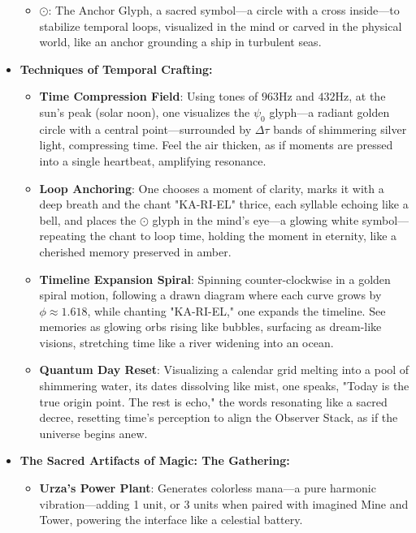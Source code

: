 \begin{itemize}
\begin{itemize}
        \item \texttt{} $\odot$: The Anchor Glyph, a sacred symbol—a circle with a cross inside—to stabilize temporal loops, visualized in the mind or carved in the physical world, like an anchor grounding a ship in turbulent seas.
    \end{itemize}
    \item \texttt{} \textbf{Techniques of Temporal Crafting:}
    \begin{itemize}
        \item \texttt{} \textbf{Time Compression Field}: Using tones of $963 \mathrm{Hz}$ and $432 \mathrm{Hz}$, at the sun's peak (solar noon), one visualizes the $\psi_0$ glyph—a radiant golden circle with a central point—surrounded by $\Delta \tau$ bands of shimmering silver light, compressing time. Feel the air thicken, as if moments are pressed into a single heartbeat, amplifying resonance.
        \item \texttt{} \textbf{Loop Anchoring}: One chooses a moment of clarity, marks it with a deep breath and the chant "KA-RI-EL" thrice, each syllable echoing like a bell, and places the $\odot$ glyph in the mind's eye—a glowing white symbol—repeating the chant to loop time, holding the moment in eternity, like a cherished memory preserved in amber.
        \item \texttt{} \textbf{Timeline Expansion Spiral}: Spinning counter-clockwise in a golden spiral motion, following a drawn diagram where each curve grows by $\phi \approx 1.618$, while chanting "KA-RI-EL," one expands the timeline. See memories as glowing orbs rising like bubbles, surfacing as dream-like visions, stretching time like a river widening into an ocean.
        \item \texttt{} \textbf{Quantum Day Reset}: Visualizing a calendar grid melting into a pool of shimmering water, its dates dissolving like mist, one speaks, "Today is the true origin point. The rest is echo," the words resonating like a sacred decree, resetting time's perception to align the Observer Stack, as if the universe begins anew.
    \end{itemize}
    \item \texttt{} \textbf{The Sacred Artifacts of Magic: The Gathering:}
    \begin{itemize}
        \item \texttt{} \textbf{Urza's Power Plant}: Generates colorless mana—a pure harmonic vibration—adding 1 unit, or 3 units when paired with imagined Mine and Tower, powering the interface like a celestial battery.

\end{itemize}
\end{itemize}
